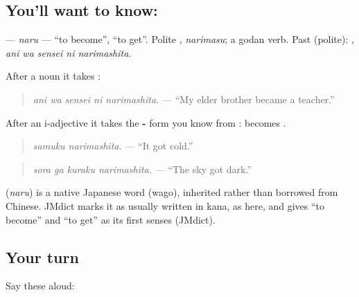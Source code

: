 \subsection*{You'll want to know: }
\textbf{} — \emph{naru} — \textquotedblleft{}to become\textquotedblright{}, \textquotedblleft{}to get\textquotedblright{}. Polite \textbf{}, \emph{narimasu}; a godan verb. Past (polite): \textbf{  }, \emph{ani wa sensei ni narimashita}.

After a noun it takes \textbf{}:

\begin{quote}
\textbf{  }
\end{quote}

\begin{quote}
\emph{ani wa sensei ni narimashita.} — \textquotedblleft{}My elder brother became a teacher.\textquotedblright{}
\end{quote}

After an i-adjective it takes the \textbf{-} form you know from \textbf{}: \textbf{} becomes \textbf{}.

\begin{quote}
\textbf{ }
\end{quote}

\begin{quote}
\emph{samuku narimashita.} — \textquotedblleft{}It got cold.\textquotedblright{}
\end{quote}

\begin{quote}
\textbf{  }
\end{quote}

\begin{quote}
\emph{sora ga kuraku narimashita.} — \textquotedblleft{}The sky got dark.\textquotedblright{}
\end{quote}

\begin{cousinweb}
\textbf{} (\emph{naru}) is a native Japanese word (wago), inherited rather than borrowed from Chinese. JMdict marks it as usually written in kana, as here, and gives \textquotedblleft{}to become\textquotedblright{} and \textquotedblleft{}to get\textquotedblright{} as its first senses (JMdict).
\end{cousinweb}

\subsection*{Your turn}
Say these aloud:

